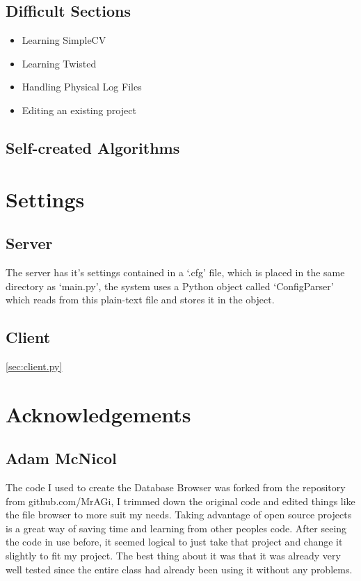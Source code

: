 \documentclass[a4paper]{article}
\begin{document}
\subsection{Difficult Sections}
\begin{itemize}
    \item Learning SimpleCV
    \item Learning Twisted
    \item Handling Physical Log Files
    \item Editing an existing project
\end{itemize}
\subsection{Self-created Algorithms}
\section{Settings}
\subsection{Server}
The server has it's settings contained in a `.cfg' file, which is placed in the same directory as `main.py',
the system uses a Python object called `ConfigParser' which reads from this plain-text file and stores it in
the object.


\subsection{Client}
\ref{sec:client.py}
%
\section{Acknowledgements}
\subsection{Adam McNicol}
The code I used to create the Database Browser was forked from the repository from github.com/MrAGi, I trimmed
down the original code and edited things like the file browser to more suit my needs. Taking advantage of
open source projects is a great way of saving time and learning from other peoples code. After seeing the code
in use before, it seemed logical to just take that project and change it slightly to fit my project. The best
thing about it was that it was already very well tested since the entire class had already been using it without
any problems.
\end{document}
